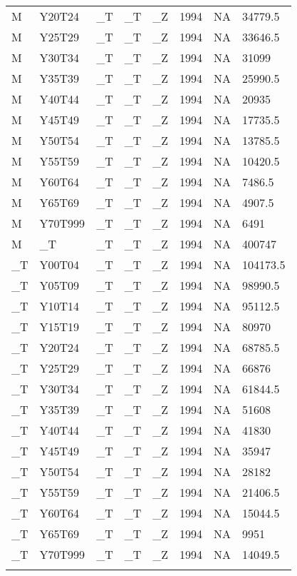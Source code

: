 \begin{longtable}[t]{llllllll}
M & Y20T24 & \_T & \_T & \_Z & 1994 & NA & 34779.5\\
M & Y25T29 & \_T & \_T & \_Z & 1994 & NA & 33646.5\\
\addlinespace
M & Y30T34 & \_T & \_T & \_Z & 1994 & NA & 31099\\
M & Y35T39 & \_T & \_T & \_Z & 1994 & NA & 25990.5\\
M & Y40T44 & \_T & \_T & \_Z & 1994 & NA & 20935\\
M & Y45T49 & \_T & \_T & \_Z & 1994 & NA & 17735.5\\
M & Y50T54 & \_T & \_T & \_Z & 1994 & NA & 13785.5\\
\addlinespace
M & Y55T59 & \_T & \_T & \_Z & 1994 & NA & 10420.5\\
M & Y60T64 & \_T & \_T & \_Z & 1994 & NA & 7486.5\\
M & Y65T69 & \_T & \_T & \_Z & 1994 & NA & 4907.5\\
M & Y70T999 & \_T & \_T & \_Z & 1994 & NA & 6491\\
M & \_T & \_T & \_T & \_Z & 1994 & NA & 400747\\
\addlinespace
\_T & Y00T04 & \_T & \_T & \_Z & 1994 & NA & 104173.5\\
\_T & Y05T09 & \_T & \_T & \_Z & 1994 & NA & 98990.5\\
\_T & Y10T14 & \_T & \_T & \_Z & 1994 & NA & 95112.5\\
\_T & Y15T19 & \_T & \_T & \_Z & 1994 & NA & 80970\\
\_T & Y20T24 & \_T & \_T & \_Z & 1994 & NA & 68785.5\\
\addlinespace
\_T & Y25T29 & \_T & \_T & \_Z & 1994 & NA & 66876\\
\_T & Y30T34 & \_T & \_T & \_Z & 1994 & NA & 61844.5\\
\_T & Y35T39 & \_T & \_T & \_Z & 1994 & NA & 51608\\
\_T & Y40T44 & \_T & \_T & \_Z & 1994 & NA & 41830\\
\_T & Y45T49 & \_T & \_T & \_Z & 1994 & NA & 35947\\
\addlinespace
\_T & Y50T54 & \_T & \_T & \_Z & 1994 & NA & 28182\\
\_T & Y55T59 & \_T & \_T & \_Z & 1994 & NA & 21406.5\\
\_T & Y60T64 & \_T & \_T & \_Z & 1994 & NA & 15044.5\\
\_T & Y65T69 & \_T & \_T & \_Z & 1994 & NA & 9951\\
\_T & Y70T999 & \_T & \_T & \_Z & 1994 & NA & 14049.5\\
\addlinespace

\end{longtable}

